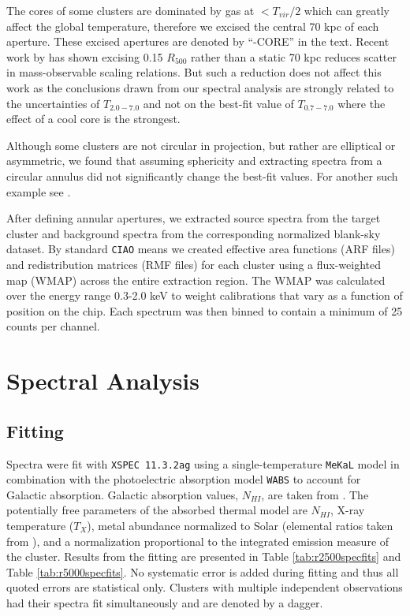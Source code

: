 \documentclass{emulateapj}
\begin{document}
The cores of some clusters are dominated by gas at $< T_{vir}/2$ which
can greatly affect the global temperature, therefore we excised the
central 70 kpc of each aperture. These excised apertures are denoted
by ``-CORE'' in the text. Recent work by \citealt{2007astro.ph..3504M}
has shown excising 0.15 $R_{500}$ rather than a static 70 kpc reduces
scatter in mass-observable scaling relations. But such a reduction
does not affect this work as the conclusions drawn from our spectral
analysis are strongly related to the uncertainties of $T_{2.0-7.0}$
and not on the best-fit value of $T_{0.7-7.0}$ where the effect of a
cool core is the strongest.

Although some clusters are not circular in projection, but rather are
elliptical or asymmetric, we found that assuming sphericity and
extracting spectra from a circular annulus did not significantly
change the best-fit values. For another such example see
\cite{2005MNRAS.359.1481B}.

After defining annular apertures, we extracted source spectra from the
target cluster and background spectra from the corresponding
normalized blank-sky dataset. By standard {\tt CIAO} means we created
effective area functions (ARF files) and redistribution matrices (RMF
files) for each cluster using a flux-weighted map (WMAP) across the
entire extraction region. The WMAP was calculated over the energy
range 0.3-2.0 keV to weight calibrations that vary as a function of
position on the chip. Each spectrum was then binned to contain a
minimum of 25 counts per channel.

\section{Spectral Analysis} \label{sec:specan}

\subsection{Fitting} \label{sec:fitting}

Spectra were fit with {\tt XSPEC 11.3.2ag} \citep{1996ASPC..101...17A}
using a single-temperature {\tt MeKaL} model in combination with the
photoelectric absorption model {\tt WABS} \citep{1983ApJ...270..119M}
to account for Galactic absorption. Galactic absorption values,
$N_{HI}$, are taken from \cite{1990ARA&A..28..215D}. The potentially
free parameters of the absorbed thermal model are
$N_{HI}$, X-ray temperature ($T_{X}$), metal abundance normalized to Solar
(elemental ratios taken from \cite{1989GeCoA..53..197A}), and a
normalization proportional to the integrated emission measure of the
cluster. Results from the fitting are presented in Table
\ref{tab:r2500specfits} and Table \ref{tab:r5000specfits}. No
systematic error is added during fitting and thus all quoted errors
are statistical only. Clusters with multiple independent observations
had their spectra fit simultaneously and are denoted by a dagger.
\end{document}
